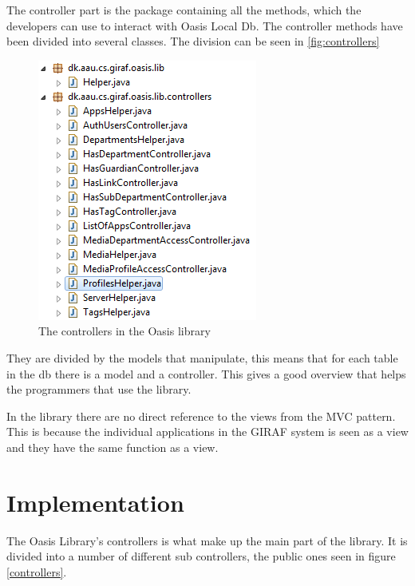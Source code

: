 The controller part is the package containing all the methods, which the developers can use to interact with Oasis Local Db.
The controller methods have been divided into several classes.
The division can be seen in \autoref{fig:controllers}
\begin{figure}
	\centering
		\includegraphics[width=\textwidth]{images/controllers.png}
	\caption{The controllers in the Oasis library}
	\label{fig:controllers}
\end{figure}

They are divided by the models that manipulate, this means that for each table in the db there is a model and a controller.
This gives a good overview that helps the programmers that use the library.

In the library there are no direct reference to the views from the MVC pattern.
This is because the individual applications in the GIRAF system is seen as a view and they have the same function as a view.

\section{Implementation}
\label{sec:LibImp}
The Oasis Library's controllers is what make up the main part of the library. It is divided into a number of different sub controllers, the public ones seen in figure \vref{controllers}.

